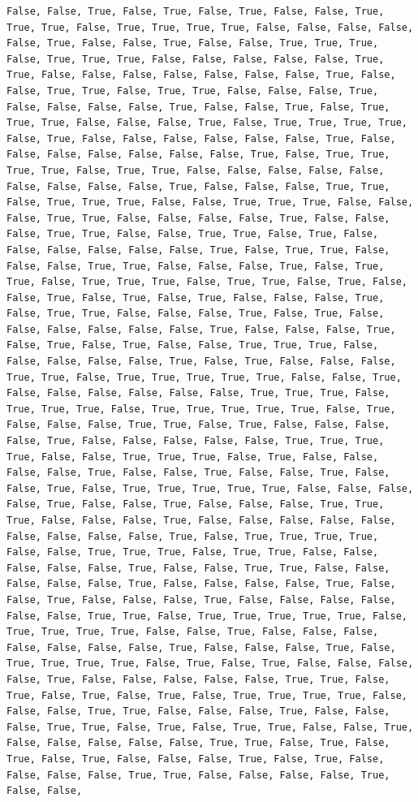 \documentclass[
  letterpaper,
  DIV=11,
  numbers=noendperiod]{scrartcl}
\begin{document}
\begin{verbatim}
False, False, True, False, True, False, True, False, False, True, True, True, False, True, True, True, True, False, False, False, False, False, True, False, False, True, False, False, True, True, True, False, True, True, True, False, False, False, False, False, True, True, False, False, False, False, False, False, False, True, False, False, True, True, False, True, True, False, False, False, True, False, False, False, False, True, False, False, True, False, True, True, True, False, False, False, True, False, True, True, True, True, False, True, False, False, False, False, False, False, True, False, False, False, False, False, False, False, True, False, True, True, True, True, False, True, True, False, False, False, False, False, False, False, False, False, True, False, False, False, True, True, False, True, True, True, False, False, True, True, True, False, False, False, True, True, False, False, False, False, True, False, False, False, True, True, False, False, True, True, False, True, False, False, False, False, False, False, True, False, True, True, False, False, False, True, True, False, False, False, True, False, True, True, False, True, True, True, False, True, True, False, True, False, False, True, False, True, False, True, False, False, False, True, False, True, True, False, False, False, True, False, True, False, False, False, False, False, False, True, False, False, False, True, False, True, False, True, False, False, True, True, True, False, False, False, False, False, True, False, True, False, False, False, True, True, False, True, True, True, True, True, False, False, True, False, False, False, False, False, False, True, True, True, False, True, True, True, False, True, True, True, True, True, False, True, False, False, False, True, True, False, True, False, False, False, False, True, False, False, False, False, False, True, True, True, True, False, False, True, True, True, False, True, False, False, False, False, True, False, False, True, False, False, True, False, False, True, False, True, True, True, True, True, False, False, False, False, True, False, False, True, False, False, False, True, True, True, False, False, False, True, False, False, False, False, False, False, False, False, False, True, False, True, True, True, True, False, False, True, True, True, False, True, True, False, False, False, False, False, True, False, False, True, True, False, False, False, False, False, True, False, False, False, False, True, False, False, True, False, False, False, True, False, False, False, False, False, False, True, True, False, True, True, True, True, True, False, True, True, True, True, False, False, True, False, False, False, False, False, False, False, True, False, False, False, True, False, True, True, True, True, False, True, False, True, False, False, False, False, True, False, False, False, False, False, True, True, False, True, False, True, False, True, False, True, True, True, True, False, False, False, True, True, False, False, False, True, False, False, False, True, True, False, True, False, True, True, False, False, True, False, False, False, False, False, True, True, False, True, False, True, False, True, False, False, False, True, False, True, False, False, False, False, True, True, False, False, False, False, True, False, False, 
\end{verbatim}
\end{document}
